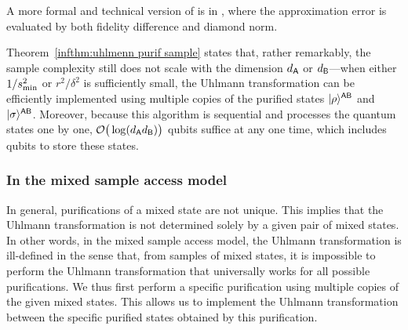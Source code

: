 A more formal and technical version of  is  in , where the approximation error is evaluated by both fidelity difference and diamond norm.

Theorem~\ref{infthm:uhlmenn purif sample} states that, rather remarkably, the sample complexity still does not scale with the dimension $d_{\mathsf{A}}$ or $ d_{\mathsf{B}}$---when either $1/s_{\rm min}^2$ or $r^2/\delta^2$ is sufficiently small, the Uhlmann transformation can be efficiently implemented using multiple copies of the purified states $|\rho\rangle^{{\mathsf{A}}{\mathsf{B}}}$ and $|\sigma\rangle^{{\mathsf{A}}{\mathsf{B}}}$. 
Moreover, because this algorithm is sequential and processes the quantum states one by one, ${\mathcal{O}}\big(\log(d_{\mathsf{A}} d_{\mathsf{B}})\big)$ qubits suffice at any one time, which includes qubits to store these states.

















\subsubsection{In the mixed sample access model}
\label{sec:upper mixed sample main}




In general, purifications of a mixed state are not unique. 
This implies that the Uhlmann transformation is not determined solely by a given pair of mixed states.
In other words, in the mixed sample access model, the Uhlmann transformation is ill-defined in the sense that, from samples of mixed states, it is impossible to perform the Uhlmann transformation that universally works for all possible purifications.
We thus first perform a specific purification using multiple copies of the given mixed states.
This allows us to implement the Uhlmann transformation between the specific purified states obtained by this purification.

